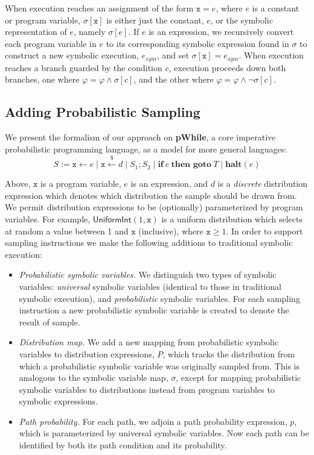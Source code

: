 %
When execution reaches an assignment of the form $\mathtt{x} = e$, where $e$ is a constant or program variable, $\sigma[\mathtt{x}]$ is either just the constant, $e$, or the symbolic representation of $e$, namely $\sigma[e]$.
% 
If $e$ is an expression, we recursively convert each program variable in $e$ to its corresponding symbolic expression found in $\sigma$ to construct a new symbolic execution, $e_{sym}$, and set $\sigma[\mathtt{x}] = e_{sym}$.
% 
When execution reaches a branch guarded by the condition $c$, execution proceeds down both branches, one where $\varphi = \varphi \wedge \sigma[c]$, and the other where $\varphi = \varphi \wedge \neg \sigma[c]$. 


\subsection{Adding Probabilistic Sampling}
We present the formalism of our approach on \textbf{pWhile}, a core imperative probabilistic programming language, as a model for more general languages:
% 
\[
S := \mathtt{x} \leftarrow e \mid \mathtt{x} \xleftarrow{\$} d \mid S_1 ; S_2 \mid \mathbf{if}~e~\textbf{then goto}~T \mid \textbf{halt}(e)
\]

Above, $\mathtt{x}$ is a program variable, $e$ is an expression, and $d$ is a \textit{discrete} distribution expression which denotes which distribution the sample should be drawn from.
% 
We permit distribution expressions to be (optionally) parameterized by program variables.
% 
For example, $\mathsf{UniformInt}(1,\mathtt{x})$ is a uniform distribution which selects at random a value between 1 and $\mathtt{x}$ (inclusive), where $\mathtt{x} \geq 1$.
% 
In order to support sampling instructions we make the following additions to traditional symbolic execution:
% 
\begin{itemize}
	\item \textit{Probabilistic symbolic variables.} We distinguish two types of symbolic variables: \textit{universal} symbolic variables (identical to those in traditional symbolic execution), and \textit{probabilistic} symbolic variables.
	For each sampling instruction a new probabilistic symbolic variable is created to denote the result of sample.
	\item \textit{Distribution map.} We add a new mapping from probabilistic symbolic variables to distribution expressions, $P$, which tracks the distribution from which a probabilistic symbolic variable was originally sampled from.
	This is analogous to the symbolic variable map, $\sigma$, except for mapping probabilistic symbolic variables to distributions instead from program variables to symbolic expressions.
	\item \textit{Path probability.} For each path, we adjoin a path probability expression, $p$, which is parameterized by universal symbolic variables.
	Now each path can be identified by both its path condition and its probability.
\end{itemize}

